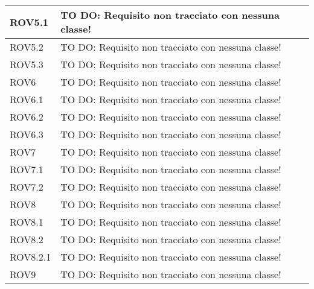 \begin{center}
\begin{longtable}{| p{4cm} | p{8cm} |}
\hline
ROV5.1 & TO DO: Requisito non tracciato con nessuna classe! \\
\hline
ROV5.2 & TO DO: Requisito non tracciato con nessuna classe! \\
\hline
ROV5.3 & TO DO: Requisito non tracciato con nessuna classe! \\
\hline
ROV6 & TO DO: Requisito non tracciato con nessuna classe! \\
\hline
ROV6.1 & TO DO: Requisito non tracciato con nessuna classe! \\
\hline
ROV6.2 & TO DO: Requisito non tracciato con nessuna classe! \\
\hline
ROV6.3 & TO DO: Requisito non tracciato con nessuna classe! \\
\hline
ROV7 & TO DO: Requisito non tracciato con nessuna classe! \\
\hline
ROV7.1 & TO DO: Requisito non tracciato con nessuna classe! \\
\hline
ROV7.2 & TO DO: Requisito non tracciato con nessuna classe! \\
\hline
ROV8 & TO DO: Requisito non tracciato con nessuna classe! \\
\hline
ROV8.1 & TO DO: Requisito non tracciato con nessuna classe! \\
\hline
ROV8.2 & TO DO: Requisito non tracciato con nessuna classe! \\
\hline
ROV8.2.1 & TO DO: Requisito non tracciato con nessuna classe! \\
\hline
ROV9 & TO DO: Requisito non tracciato con nessuna classe! \\
\hline
\end{longtable}
\egroup
\end{center}
